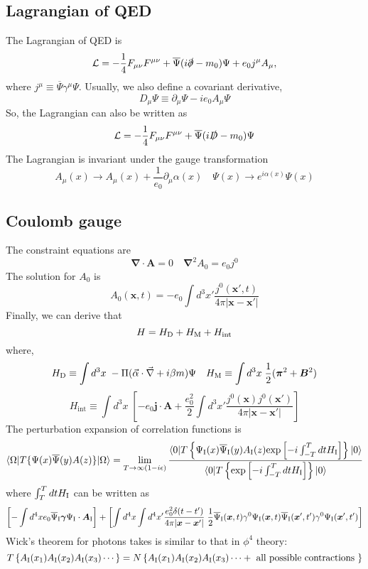 \subsection{Lagrangian of QED}
\noindent
The Lagrangian of QED is
\[\mathcal{L} = -\frac{1}{4}F_{\mu\nu}F^{\mu\nu} + \overline{\Psi} (i\slashed{\partial}-m_0) \Psi + e_0j^{\mu} A_{\mu}, \]
where $j^{\mu} \equiv \overline{\Psi}\gamma^{\mu}\Psi$. Usually, we also define a covariant derivative,
\[D_{\mu}\Psi \equiv \partial_{\mu}\Psi - ie_0A_{\mu}\Psi \]
So, the Lagrangian can also be written as
\[\mathcal{L} = -\frac{1}{4}F_{\mu\nu}F^{\mu\nu} + \overline{\Psi} (i\slashed{D}-m_0) \Psi\]
The Lagrangian is invariant under the gauge transformation
\[A_{\mu}(x) \to A_{\mu}(x) + \frac{1}{e_0}\partial_{\mu}\alpha(x) \quad \Psi(x) \to e^{i\alpha(x)} \Psi(x)\]

\subsection{Coulomb gauge}
\noindent
The constraint equations are
\[\bm{\nabla} \cdot \bm{A} = 0 \quad \bm{\nabla}^2 A_0 = e_0j^0\]
The solution for $A_0$ is
\[A_0(\bm{x},t) = -e_0 \int d^3 x' \frac{j^0(\bm{x}',t)}{4\pi|\bm{x}-\bm{x}'|}\]
Finally, we can derive that
\[H = H_{\rm D} + H_{\rm M} + H_{\mathrm{int}}\]
where,
\[H_{\rm D} \equiv \int d^3 x \; -\Pi (\vec{\alpha} \cdot \vec{\nabla} + i \beta m)\Psi \quad H_{\rm M} \equiv \int d^3x \; \frac{1}{2}(\bm{\pi}^2 + \bm{B}^2)\]
\[H_{\mathrm{int}} \equiv \int d^3x \; \left[-e_0\bm{j}\cdot\bm{A} + \frac{e_0^2}{2} \int d^3x' \frac{j^0(\bm{x}) j^0(\bm{x}')}{4\pi|\bm{x}-\bm{x}'|} \right]\]
The perturbation expansion of correlation functions is
\[\langle \Omega | T \{\Psi(x) \overline{\Psi}(y) A(z) \} | \Omega \rangle = \lim_{T \to \infty(1-i\epsilon)} \frac{\langle 0 | T \left\{ \Psi_{\rm I}(x) \overline{\Psi}_{\rm I}(y) A_{\rm I}(z) \mathrm{exp} \left[ -i \int_{-T}^{T} dt H_{\rm I} \right]\right\} | 0 \rangle}{\langle 0 | T \left\{ \mathrm{exp} \left[ -i \int_{-T}^{T} dt H_{\rm I} \right]\right\} | 0 \rangle}\]
where $\int_{T}^{T} dt H_{\rm I}$ can be written as
\[\left[-\int d^4x e_0\overline{\Psi}_{\rm I}\bm{\gamma}\Psi_{\rm I}\cdot\bm{A}_{\rm I} \right] +\left[ \int d^4x \int d^4x' \frac{e_0^2\delta(t-t')}{4\pi|\bm{x}-\bm{x}'|}\; \frac{1}{2} \overline{\Psi}_{\rm I}(\bm{x},t)\gamma^0 \Psi_{\rm I}(\bm{x},t) \overline{\Psi}_{\rm I}(\bm{x}',t')\gamma^0 \Psi_{\rm I}(\bm{x}',t') \right]\]
Wick's theorem for photons takes is similar to that in $\phi^4$ theory:
\[T \left\{ A_{\rm I}(x_1) A_{\rm I}(x_2)  A_{\rm I}(x_3) \cdots \right\} = N \left\{A_{\rm I}(x_1) A_{\rm I}(x_2)  A_{\rm I}(x_3) \cdots + \mbox{ all possible contractions }\right\} \]

